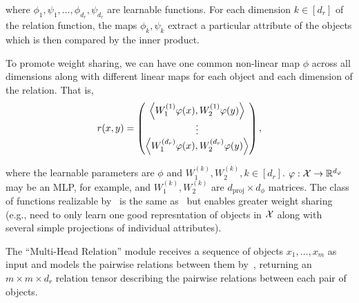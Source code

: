 \noindent where $\phi_1, \psi_1, \ldots, \phi_{d_r}, \psi_{d_r}$ are learnable functions. For each dimension $k \in [d_r]$ of the relation function, the maps $\phi_k, \psi_k$ extract a particular attribute of the objects which is then compared by the inner product.

To promote weight sharing, we can have one common non-linear map $\phi$ across all dimensions along with different linear maps for each object and each dimension of the relation. That is,
\begin{equation}\label{eq:relation_function_lin_proj}
    r(x, y) = \begin{pmatrix}
        \left \langle W_1^{(1)}\varphi(x), W_2^{(1)}\varphi(y) \right\rangle \\
        \vdots \\
        \left \langle W_1^{(d_r)}\varphi(x), W_2^{(d_r)}\varphi(y) \right\rangle \\
    \end{pmatrix},
\end{equation}

\noindent where the learnable parameters are $\phi$ and $W_1^{(k)}, W_2^{(k)}, k \in [d_r]$. $\varphi: {\mathcal{X}} \to \mathbb{R}^{d_\varphi}$ may be an MLP, for example, and $W_1^{(k)}, W_2^{(k)}$ are $d_{\mathrm{proj}} \times d_\phi$ matrices. The class of functions realizable by~ is the same as~ but enables greater weight sharing (e.g., need to only learn one good represntation of objects in ${\mathcal{X}}$ along with several simple projections of individual attributes).

The ``Multi-Head Relation'' module receives a sequence of objects $x_1, \ldots, x_m$ as input and models the pairwise relations between them by~, returning an $m \times m \times d_r$ relation tensor describing the pairwise relations between each pair of objects.

% 